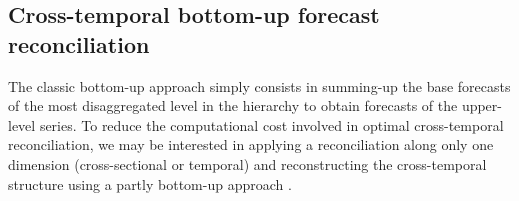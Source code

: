 \documentclass[a4paper,11pt]{article}
\theoremstyle{definition}
\begin{document}
\subsection{Cross-temporal bottom-up forecast reconciliation}\label{ssec:ctbu}

The classic bottom-up approach \citep{dunn1976, dangerfield1992} simply consists in summing-up the base forecasts of the most disaggregated level in the hierarchy to obtain forecasts of the upper-level series. To reduce the computational cost involved in optimal cross-temporal reconciliation, we may be interested in applying a reconciliation along only one dimension (cross-sectional or temporal) and reconstructing the cross-temporal structure using a partly bottom-up approach \citep{difonzo2022b, difonzo2023a, sanguri2022}.

\begin{figure}[!t]
	\centering


\end{figure}
\end{document}
